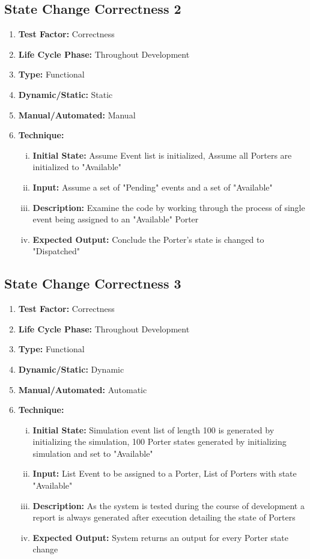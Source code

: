 \documentclass[paper=letter, fontsize=10pt]{scrartcl}
\numberwithin{equation}{section}		%
\numberwithin{figure}{section}			%
\numberwithin{table}{section}				%
\begin{document}
\subsection{State Change Correctness 2}
\begin{enumerate}[]
	\item \textbf{Test Factor:} Correctness
	\item \textbf{Life Cycle Phase:} Throughout Development
	\item \textbf{Type:} Functional
	\item \textbf{Dynamic/Static:} Static
	\item \textbf{Manual/Automated:} Manual
	\item \textbf{Technique:}
		\begin{enumerate}[(i)]
			\item \textbf{Initial State:} Assume Event list is initialized, Assume all Porters are initialized to "Available"
			\item \textbf{Input:} Assume a set of "Pending" events and a set of "Available"  
			\item \textbf{Description:} Examine the code by working through the process of single event being assigned to an "Available" Porter
			\item \textbf{Expected Output:} Conclude the Porter's state is changed to "Dispatched"
		\end{enumerate}
\end{enumerate}

\subsection{State Change Correctness 3}
\begin{enumerate}[]
	\item \textbf{Test Factor:} Correctness
	\item \textbf{Life Cycle Phase:} Throughout Development
	\item \textbf{Type:} Functional
	\item \textbf{Dynamic/Static:} Dynamic
	\item \textbf{Manual/Automated:} Automatic
	\item \textbf{Technique:}
		\begin{enumerate}[(i)]
			\item \textbf{Initial State:} Simulation event list of length 100 is generated by initializing the simulation, 100 Porter states generated by initializing simulation and set to "Available"
			\item \textbf{Input:} List Event to be assigned to a Porter, List of Porters with state "Available"
			\item \textbf{Description:} As the system is tested during the course of development a report is always generated after execution detailing the state of Porters
			\item \textbf{Expected Output:} System returns an output for every Porter state change
		\end{enumerate}
\end{enumerate}
\end{document}
